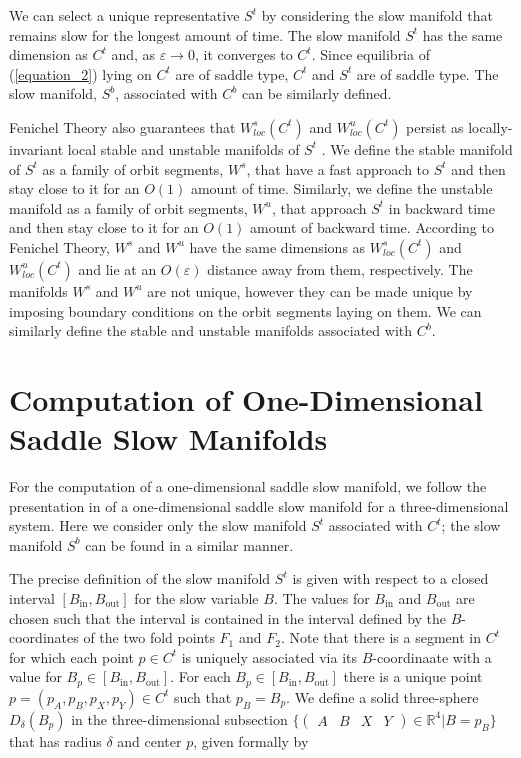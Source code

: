 \documentclass{ws-ijbc}
\begin{document}
We can select a unique representative $S^t$ by considering the slow manifold that remains slow for the longest amount of time.  The slow manifold $S^t$ has the same dimension as $C^t$ and, as $\varepsilon \rightarrow 0$, it converges to $C^t$.  Since equilibria of (\ref{equation_2}) lying on $C^t$ are of saddle type, $C^t$ and $S^t$ are of saddle type.  The slow manifold, $S^b$, associated with $C^b$ can be similarly defined.
    
Fenichel Theory also guarantees that $W^{s}_{loc}(C^t)$ and $W^{u}_{loc}(C^t)$ persist as locally-invariant local stable and unstable manifolds of $S^t$ \cite{Fenichel}.  We define the stable manifold of $S^t$ as a family of orbit segments, $W^s$, that have a fast approach to $S^t$ and then stay close to it for an $O(1)$ amount of time.  Similarly, we define the unstable manifold as a family of orbit segments, $W^u$, that approach $S^t$ in backward time and then stay close to it for an $O(1)$ amount of backward time.  According to Fenichel Theory, $W^s$ and $W^u$ have the same dimensions as $W^{s}_{loc}(C^t)$ and $W^{u}_{loc}(C^t)$ and lie at an $O(\varepsilon)$ distance away from them, respectively.  The manifolds $W^s$ and $W^u$ are not unique, however they can be made unique by imposing boundary conditions on the orbit segments laying on them.   We can similarly define the stable and unstable manifolds associated with $C^b$.
 
 \section{Computation of One-Dimensional Saddle Slow Manifolds}
    
For the computation of a one-dimensional saddle slow manifold, we follow the presentation in \cite{Saeed_Paper} of a one-dimensional saddle slow manifold for a three-dimensional system.  Here we consider only the slow manifold $S^t$ associated with $C^t$; the slow manifold $S^b$ can be found in a similar manner.
    
The precise definition of the slow manifold $S^t$ is given with respect to a closed interval $[B_{\mathrm{in}},B_{\mathrm{out}}]$ for the slow variable $B$.  The values for $B_{\mathrm{in}}$ and $B_{\mathrm{out}}$ are chosen such that the interval is contained in the interval defined by the $B$-coordinates of the two fold points $F_1$ and $F_2$.  Note that there is a segment in $C^t$ for which each point $p \in C^t$ is uniquely associated via its $B$-coordinaate with a value for $B_p \in [B_{\mathrm{in}},B_{\mathrm{out}}]$.  For each $B_p \in [B_{\mathrm{in}},B_{\mathrm{out}}]$ there is a unique point $p=(p_A,p_B,p_X,p_Y) \in C^t$ such that $p_B = B_p$.  We define a solid three-sphere $D_\delta(B_p)$ in the three-dimensional subsection $\{ \begin{pmatrix} A & B & X & Y \end{pmatrix} \in \mathbb{R}^4| B=p_B\}$ that has radius $\delta$ and center $p$, given formally by
\end{document}
